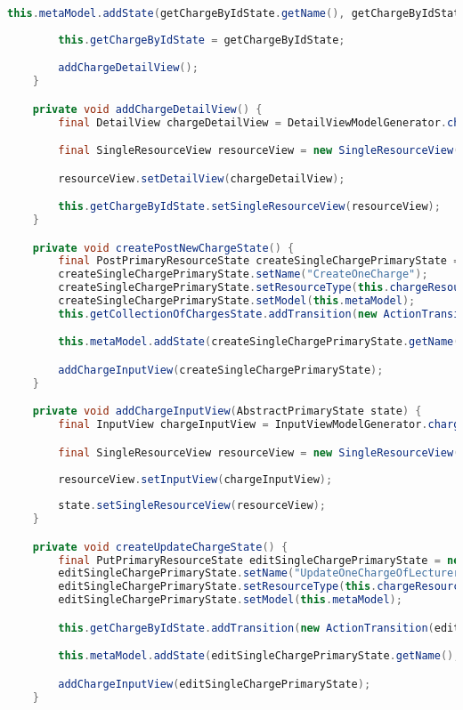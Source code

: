 \begin{lstlisting}[label=lst:enfield_model,
language=java,
firstnumber=1,
caption=Beschreibung des \textit{Enfield-Modell} der Referenzimplementierung. ]
		this.metaModel.addState(getChargeByIdState.getName(), getChargeByIdState);
	
		this.getChargeByIdState = getChargeByIdState;

		addChargeDetailView();
	}

	private void addChargeDetailView() {
		final DetailView chargeDetailView = DetailViewModelGenerator.charge();

		final SingleResourceView resourceView = new SingleResourceView();

		resourceView.setDetailView(chargeDetailView);

		this.getChargeByIdState.setSingleResourceView(resourceView);
	}

	private void createPostNewChargeState() {
		final PostPrimaryResourceState createSingleChargePrimaryState = new PostPrimaryResourceState();
		createSingleChargePrimaryState.setName("CreateOneCharge");
		createSingleChargePrimaryState.setResourceType(this.chargeResource);
		createSingleChargePrimaryState.setModel(this.metaModel);
		this.getCollectionOfChargesState.addTransition(new ActionTransition(createSingleChargePrimaryState, "createChargeOfLecturer"));

		this.metaModel.addState(createSingleChargePrimaryState.getName(), createSingleChargePrimaryState);

		addChargeInputView(createSingleChargePrimaryState);
	}

	private void addChargeInputView(AbstractPrimaryState state) {
		final InputView chargeInputView = InputViewModelGenerator.charge();

		final SingleResourceView resourceView = new SingleResourceView();
	
		resourceView.setInputView(chargeInputView);
	
		state.setSingleResourceView(resourceView);
	}

	private void createUpdateChargeState() {
		final PutPrimaryResourceState editSingleChargePrimaryState = new PutPrimaryResourceState();
		editSingleChargePrimaryState.setName("UpdateOneChargeOfLecturer");
		editSingleChargePrimaryState.setResourceType(this.chargeResource);
		editSingleChargePrimaryState.setModel(this.metaModel);

		this.getChargeByIdState.addTransition(new ActionTransition(editSingleChargePrimaryState, "updateCharge"));

		this.metaModel.addState(editSingleChargePrimaryState.getName(), editSingleChargePrimaryState);

		addChargeInputView(editSingleChargePrimaryState);
	}


\end{lstlisting}
